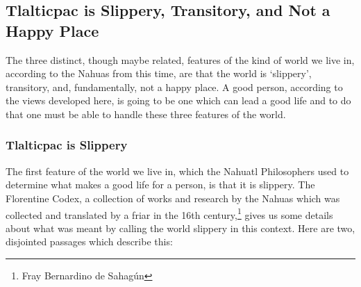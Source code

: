 \subsection{Tlalticpac is Slippery, Transitory, and Not a Happy Place} 

The three distinct, though maybe related, features of the kind of world we live in, according to the Nahuas from this time, are that the world is `slippery', transitory, and, fundamentally, not a happy place. A good person, according to the views developed here, is going to be one which can lead a good life and to do that one must be able to handle these three features of the world. 

\subsubsection{Tlalticpac is Slippery}

The first feature of the world we live in, which the Nahuatl Philosophers used to determine what makes a good life for a person, is that it is slippery. The Florentine Codex, a collection of works and research by the Nahuas which was collected and translated by a friar in the 16th century,\footnote{Fray Bernardino de Sahag\'un} gives us some details about what was meant by calling the world slippery in this context. Here are two, disjointed passages which describe this:

